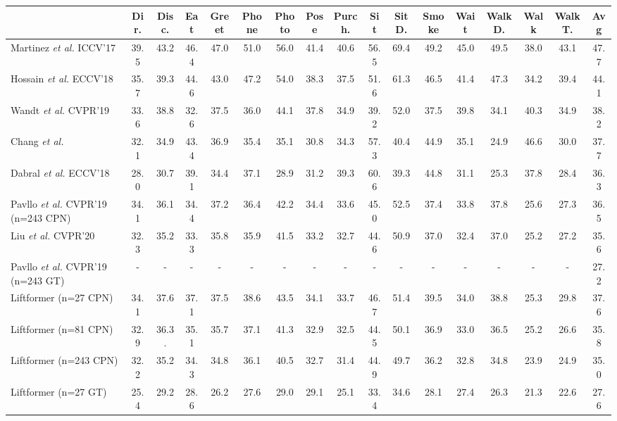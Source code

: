 \documentclass[letterpaper]{article}
\begin{document}
\begin{table*}[tp]
\begin{adjustbox}{width=1\textwidth}
\begin{tabular}{l|ccccccccccccccc|c}
& Dir. & Disc. & Eat & Greet & Phone & Photo & Pose & Purch. & Sit & SitD. & Smoke & Wait & WalkD. & Walk & WalkT. & Avg \\
\hline
Martinez \textit{et al.} ICCV’17 \cite{martinez17} & 39.5 & 43.2 & 46.4 & 47.0 & 51.0 & 56.0 & 41.4 & 40.6 & 56.5 & 69.4 & 49.2 & 45.0 & 49.5 & 38.0 & 43.1 & 47.7\\
Hossain \textit{et al.} ECCV’18 \cite{hossain18} & 35.7 & 39.3 & 44.6 & 43.0 & 47.2 & 54.0 & 38.3 & 37.5 & 51.6 & 61.3 & 46.5 & 41.4 & 47.3 & 34.2 & 39.4 & 44.1\\
Wandt \textit{et al.} CVPR'19 \cite{wandt19} & 33.6 & 38.8 & 32.6 & 37.5 & 36.0 & 44.1 & 37.8 & 34.9 & 39.2 & 52.0 & 37.5 & 39.8 & 34.1 & 40.3 & 34.9 & 38.2\\
Chang \textit{et al.} \cite{chang20} & 32.1 & 34.9 & 43.4 & 36.9 & 35.4 & 35.1 & 30.8 & 34.3 & 57.3 & 40.4 & 44.9 & 35.1 & 24.9 & 46.6 & 30.0 & 37.7\\
Dabral \textit{et al.} ECCV’18 \cite{dabral18} & 28.0 & 30.7 & 39.1 & 34.4 & 37.1 & 28.9 & 31.2 & 39.3 & 60.6 & 39.3 & 44.8 & 31.1 & 25.3 & 37.8 & 28.4 & 36.3\\
Pavllo \textit{et al.} CVPR’19 \cite{pavllo19} (n=243 CPN) & 34.1 & 36.1 & 34.4 & 37.2 & 36.4 & 42.2 & 34.4 & 33.6 & 45.0 & 52.5 & 37.4 & 33.8 & 37.8 & 25.6 & 27.3 & 36.5\\
Liu \textit{et al.} CVPR’20 \cite{liu20} & 32.3 & 35.2 & 33.3 & 35.8 & 35.9 & 41.5 & 33.2 & 32.7 & 44.6 & 50.9 & 37.0 & 32.4 & 37.0 & 25.2 & 27.2 & 35.6\\
Pavllo \textit{et al.} CVPR’19 \cite{pavllo19} (n=243 GT) & - & - & - & - & - & - & - & - & - & - & - & - & - & - & - & 27.2\\
\hline
Liftformer (n=27 CPN) & 34.1 & 37.6 & 37.1 & 37.5 & 38.6 & 43.5 & 34.1 & 33.7 & 46.7 & 51.4 & 39.5 & 34.0 & 38.8 & 25.3 & 29.8 & 37.6 \\
Liftformer (n=81 CPN) & 32.9 & 36.3. & 35.1 & 35.7 & 37.1 & 41.3 & 32.9 & 32.5 & 44.5 & 50.1 & 36.9 & 33.0 & 36.5 & 25.2 & 26.6 & 35.8\\
Liftformer (n=243 CPN) & 32.2 & 35.2 & 34.3 & 34.8 & 36.1 & 40.5 & 32.7 & 31.4 & 44.9 & 49.7 & 36.2 & 32.8 & 34.8 & 23.9 & 24.9 & 35.0 \\
\hline
Liftformer (n=27 GT)  & 25.4 & 29.2 & 28.6 & 26.2 & 27.6 & 29.0 & 29.1 & 25.1 & 33.4 & 34.6 & 28.1 & 27.4 & 26.3 & 21.3 & 22.6 & 27.6\\

\end{tabular}
\end{adjustbox}
\end{table*}
\end{document}
